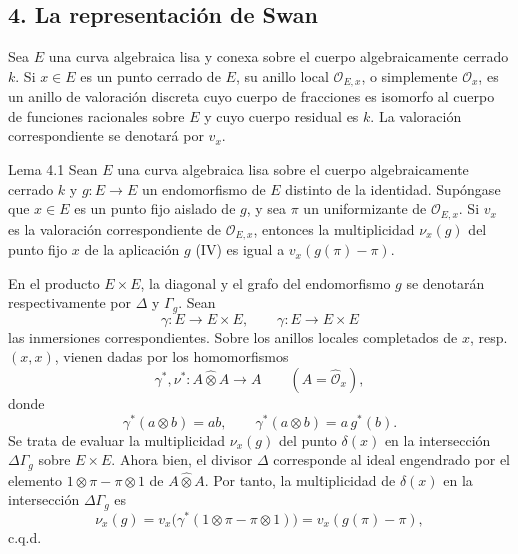 \subsection*{4. La representación de Swan}

Sea $E$ una curva algebraica lisa y conexa sobre el cuerpo algebraicamente cerrado $k$. Si $x\in E$ es un punto cerrado de $E$, su anillo local $\mathcal O_{E,x}$, o simplemente $\mathcal O_x$, es un anillo de valoración discreta cuyo cuerpo de fracciones es isomorfo al cuerpo de funciones racionales sobre $E$ y cuyo cuerpo residual es $k$. La valoración correspondiente se denotará por $v_x$.

\begin{statement}{Lema 4.1}
Sean $E$ una curva algebraica lisa sobre el cuerpo algebraicamente cerrado $k$ y $g:E\to E$ un endomorfismo de $E$ distinto de la identidad. Supóngase que $x\in E$ es un punto fijo aislado de $g$, y sea $\pi$ un uniformizante de $\mathcal O_{E,x}$. Si $v_x$ es la valoración correspondiente de $\mathcal O_{E,x}$, entonces la multiplicidad $\nu_x(g)$ del punto fijo $x$ de la aplicación $g$ (IV) es igual a $v_x(g(\pi)-\pi)$.
\end{statement}


En el producto $E\times E$, la diagonal y el grafo del endomorfismo $g$ se denotarán respectivamente por $\Delta$ y $\Gamma_g$. Sean
\[
\gamma:E\longrightarrow E\times E,\qquad
\gamma:E\longrightarrow E\times E
\]
las inmersiones correspondientes. Sobre los anillos locales completados de $x$, resp. $(x,x)$, vienen dadas por los homomorfismos
\[
\gamma^*,\nu^*:A\widehat\otimes A\longrightarrow A
\qquad (A=\widehat{\mathcal O}_x),
\]
donde
\[
\gamma^*(a\otimes b)=ab,\qquad
\gamma^*(a\otimes b)=a\,g^*(b).
\]
Se trata de evaluar la multiplicidad $\nu_x(g)$ del punto $\delta(x)$ en la intersección $\Delta\Gamma_g$ sobre $E\times E$. Ahora bien, el divisor $\Delta$ corresponde al ideal engendrado por el elemento $1\otimes\pi-\pi\otimes1$ de $A\widehat\otimes A$. Por tanto, la multiplicidad de $\delta(x)$ en la intersección $\Delta\Gamma_g$ es
\[
\nu_x(g)=v_x\bigl(\gamma^*(1\otimes\pi-\pi\otimes1)\bigr)
      =v_x(g(\pi)-\pi),
\]
c.q.d.

